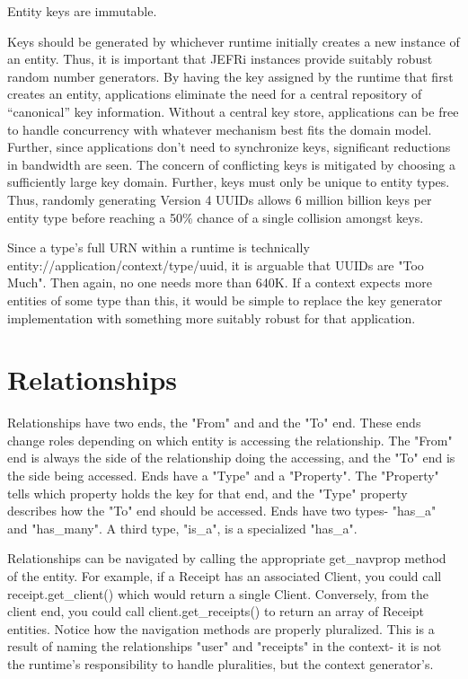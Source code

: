 \documentclass{article}
\begin{document}
Entity keys are immutable.

Keys should be generated by whichever runtime initially creates a new instance
of an entity. Thus, it is important that JEFRi instances provide suitably robust
random number generators. By having the key assigned by the runtime that first
creates an entity, applications eliminate the need for a central repository of
``canonical'' key information. Without a central key store, applications can be
free to handle concurrency with whatever mechanism best fits the domain model.
Further, since applications don't need to synchronize keys, significant
reductions in bandwidth are seen. The concern of conflicting keys is mitigated
by choosing a sufficiently large key domain. Further, keys must only be unique
to entity types. Thus, randomly generating Version 4 UUIDs allows 6 million
billion keys per entity type before reaching a 50\% chance of a single collision
amongst keys.

Since a type's full URN within a runtime is technically
entity://application/context/type/uuid, it is arguable that UUIDs are "Too
Much". Then again, no one needs more than 640K. If a context expects more
entities of some type than this, it would be simple to replace the key generator
implementation with something more suitably robust for that application.

\section{Relationships}
Relationships have two ends, the "From" and and the "To" end. These ends change
roles depending on which entity is accessing the relationship. The "From" end is
always the side of the relationship doing the accessing, and the "To" end is the
side being accessed. Ends have a "Type" and a "Property". The "Property" tells
which property holds the key for that end, and the "Type" property describes how
the "To" end should be accessed. Ends have two types- "has\_a" and "has\_many".
A third type, "is\_a", is a specialized "has\_a".

Relationships can be navigated by calling the appropriate get\_navprop method of
the entity. For example, if a Receipt has an associated Client, you could call
receipt.get\_client() which would return a single Client. Conversely, from the
client end, you could call client.get\_receipts() to return an array of Receipt
entities. Notice how the navigation methods are properly pluralized. This is a
result of naming the relationships "user" and "receipts" in the context- it is
not the runtime's responsibility to handle pluralities, but the context
generator's.
\end{document}
